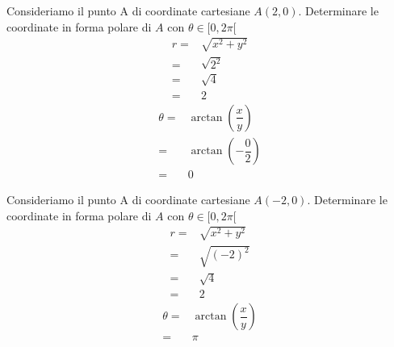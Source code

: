 \begin{esempiot}{}{} Consideriamo il punto A di coordinate cartesiane $A(2,0)$. Determinare le coordinate in forma polare di $A$ con $\theta\in[0,2\pi[$
	\begin{align*}
	r=&\sqrt{x^2+y^2}\\
	=&\sqrt{2^2}\\
	=&\sqrt{4}\\
	=&2
	\end{align*}
	\begin{align*}
	\theta=&\arctan\left(\dfrac{x}{y}\right)\\
	=&\arctan\left(-\dfrac{0}{2}\right)\\
	=&0
	\end{align*}
\end{esempiot}
\begin{esempiot}{}{} Consideriamo il punto A di coordinate cartesiane $A(-2,0)$. Determinare le coordinate in forma polare di $A$ con $\theta\in[0,2\pi[$
	\begin{align*}
	r=&\sqrt{x^2+y^2}\\
	=&\sqrt{(-2)^2}\\
	=&\sqrt{4}\\
	=&2
	\end{align*}
	\begin{align*}
	\theta=&\arctan\left(\dfrac{x}{y}\right)\\
	=&\pi\\
	\end{align*}
\end{esempiot}
